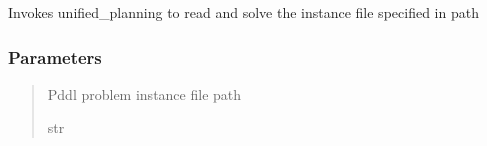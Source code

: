 \documentclass[letterpaper,10pt,english]{sphinxmanual}
\begin{document}

\begin{fulllineitems}
\label{\detokenize{api_reference/dungeon_resolver/generate_dungeon_problem:generate_dungeon_problem.invoke_unified_planning}}
\pysigstartsignatures
{}
\pysigstopsignatures
\sphinxAtStartPar
Invokes unified\_planning to read and solve the instance file specified in path


\subsubsection{Parameters}
\label{\detokenize{api_reference/dungeon_resolver/generate_dungeon_problem:id15}}\begin{quote}\begin{description}
\sphinxAtStartPar
Pddl problem instance file path

\sphinxAtStartPar
str

\end{description}\end{quote}

\end{fulllineitems}

\end{document}

